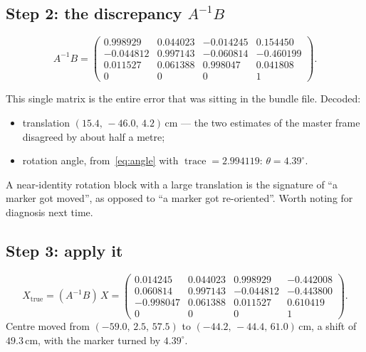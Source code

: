 \documentclass[11pt,a4paper]{article}
\begin{document}
\subsection{Step 2: the discrepancy $A^{-1}B$}

\begin{equation*}
  A^{-1}B =
  \begin{pmatrix}
     0.998929 &  0.044023 & -0.014245 &  0.154450 \\
    -0.044812 &  0.997143 & -0.060814 & -0.460199 \\
     0.011527 &  0.061388 &  0.998047 &  0.041808 \\
     0        &  0        &  0        &  1
  \end{pmatrix}.
\end{equation*}

This single matrix is the entire error that was sitting in the bundle file. Decoded:
\begin{itemize}[leftmargin=*,itemsep=1pt]
\item translation $(15.4,\,-46.0,\,4.2)$\,cm --- the two estimates of the master frame
      disagreed by about half a metre;
\item rotation angle, from~\eqref{eq:angle} with
      $\operatorname{trace} = 2.994119$: $\theta = 4.39^\circ$.
\end{itemize}
A near-identity rotation block with a large translation is the signature of ``a marker
got moved'', as opposed to ``a marker got re-oriented''. Worth noting for diagnosis next
time.

\subsection{Step 3: apply it}

\begin{equation*}
  X_{\text{true}} = (A^{-1}B)\,X =
  \begin{pmatrix}
     0.014245 & 0.044023 &  0.998929 & -0.442008 \\
     0.060814 & 0.997143 & -0.044812 & -0.443800 \\
    -0.998047 & 0.061388 &  0.011527 &  0.610419 \\
     0        & 0        &  0        &  1
  \end{pmatrix}.
\end{equation*}
Centre moved from $(-59.0,\,2.5,\,57.5)$ to $(-44.2,\,-44.4,\,61.0)$\,cm, a shift of
$49.3$\,cm, with the marker turned by $4.39^\circ$.
\end{document}

